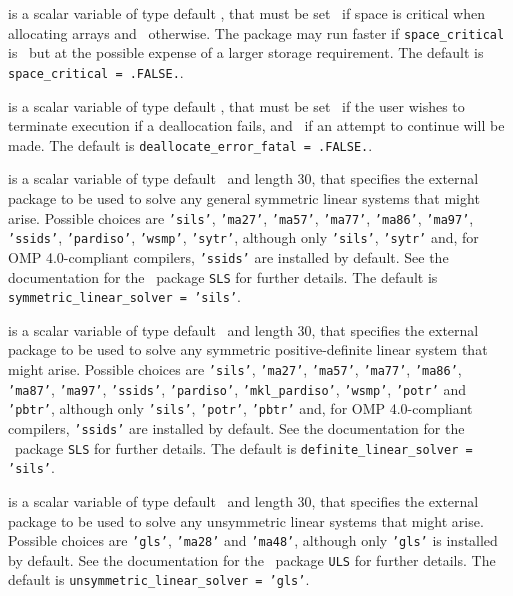 \documentclass{galahad}
\begin{document}
\begin{description}
 is a scalar variable of type default \logical,
that must be set \true\ if space is critical when allocating arrays
and  \false\ otherwise. The package may run faster if
{\tt space\_critical} is \false\ but at the possible expense of a larger
storage requirement. The default is {\tt space\_critical = .FALSE.}.

 is a scalar variable of type default \logical,
that must be set \true\ if the user wishes to terminate execution if
a deallocation  fails, and \false\ if an attempt to continue
will be made. The default is {\tt deallocate\_error\_fatal = .FALSE.}.

 is a scalar variable of type default \character\
and length 30, that specifies the external package to be used to
solve any general symmetric linear systems that might arise. Possible
choices are
{\tt 'sils'},
{\tt 'ma27'},
{\tt 'ma57'},
{\tt 'ma77'},
{\tt 'ma86'},
{\tt 'ma97'},
{\tt 'ssids'},
{\tt 'pardiso'},
{\tt 'wsmp'},
{\tt 'sytr'},
although only {\tt 'sils'}, {\tt 'sytr'}  and, for OMP 4.0-compliant compilers,
{\tt 'ssids'} are installed by default.
See the documentation for the \galahad\ package {\tt SLS} for further details.
The default is {\tt symmetric\_linear\_solver = 'sils'}.

 is a scalar variable of type default \character\
and length 30, that specifies the external package to be used to
solve any symmetric positive-definite linear system that might arise. Possible
choices are
{\tt 'sils'},
{\tt 'ma27'},
{\tt 'ma57'},
{\tt 'ma77'},
{\tt 'ma86'},
{\tt 'ma87'},
{\tt 'ma97'},
{\tt 'ssids'},
{\tt 'pardiso'},
{\tt 'mkl\_pardiso'},
{\tt 'wsmp'},
{\tt 'potr'} and
{\tt 'pbtr'},
although only {\tt 'sils'},  {\tt 'potr'}, {\tt 'pbtr'}
and, for OMP 4.0-compliant compilers,
{\tt 'ssids'} are installed by default.
See the documentation for the \galahad\ package {\tt SLS} for further details.
The default is {\tt definite\_linear\_solver = 'sils'}.

 is a scalar variable of type default
\character\
and length 30, that specifies the external package to be used to
solve any unsymmetric linear systems that might arise. Possible
choices are
{\tt 'gls'},
{\tt 'ma28'}
and
{\tt 'ma48'},
although only {\tt 'gls'} is installed by default.
See the documentation for the \galahad\ package {\tt ULS} for further details.
The default is {\tt unsymmetric\_linear\_solver = 'gls'}.


\end{description}
\end{document}
